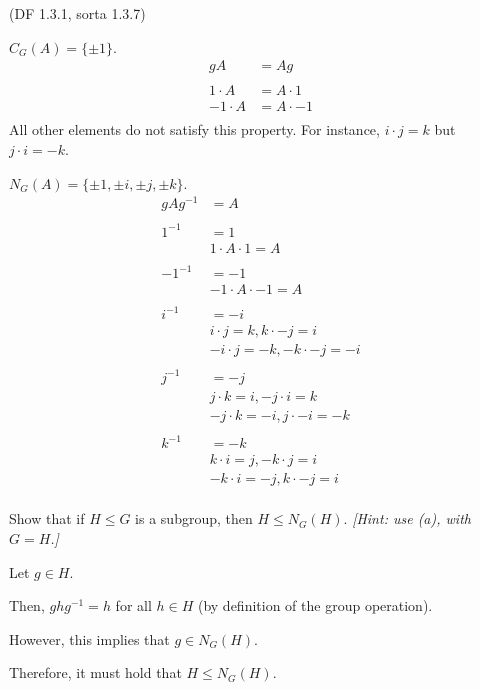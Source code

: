 \begin{problem}{\textsf{(DF 1.3.1, sorta 1.3.7)}}
\begin{enumalph}
\begin{Answer}
      \bigskip
      \begin{enumroman}
        \item $C_G(A) = \{\pm 1 \}$.
          \begin{align*}
            gA &= Ag \\
            \\
            1\cdot A &= A\cdot 1 \\
            -1 \cdot A &= A \cdot -1 \\
          \end{align*}
          All other elements do not satisfy this property.
          For instance, $i \cdot j = k$ but $j \cdot i = -k$.
        \item $N_G(A) = \{\pm 1, \pm i, \pm j, \pm k\}$.
          \begin{align*}
            gAg^{-1} &= A \\
            \\
            1^{-1} &= 1 \\
                   & 1 \cdot A \cdot 1 = A \\
                   \\
            -1^{-1} &= -1 \\
                    & -1 \cdot A \cdot -1 = A \\
                    \\
            i^{-1} &= -i \\
                   & i \cdot j = k, k \cdot -j = i \\
                    & -i \cdot j = -k, -k \cdot -j = -i \\
                \\
            j^{-1} &= -j \\
                   & j \cdot k = i, -j \cdot i = k \\
                   & -j \cdot k = -i, j \cdot -i = -k \\
                \\
            k^{-1} &= -k \\
                   & k \cdot i = j, -k \cdot j = i \\
                   & -k \cdot i = -j, k \cdot -j = i \\
          \end{align*}
      \end{enumroman}
    \end{Answer}
    \item Show that if $H \leq G$ is a subgroup, then $H \leq N_G(H)$.  \emph{[Hint: 
    use (a), with $G=H$.]}
    \begin{Answer}
      Let $g \in H$.

      Then, $ghg^{-1} = h$ for all $h \in H$ (by definition of the group operation).

      However, this implies that $g \in N_G(H)$.

      Therefore, it must hold that $H \leq N_G(H)$.
    \end{Answer}
  \end{enumalph}
\end{problem}
